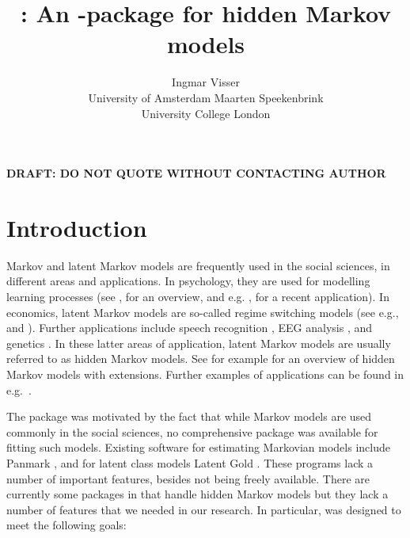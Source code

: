 \documentclass[article]{jss}
\author{Ingmar Visser\\University of Amsterdam \And 
        Maarten Speekenbrink\\University College London}
\title{\pkg{depmixS4} : An \proglang{R}-package for hidden Markov models}
\begin{document}

\maketitle



\begin{center}
\bf{DRAFT: DO NOT QUOTE WITHOUT CONTACTING AUTHOR}
\end{center}

\section{Introduction}

Markov and latent Markov models are frequently used in the social
sciences, in different areas and applications.  In psychology, they
are used for modelling learning processes (see \citealp{Wickens1982},
for an overview, and e.g. \citealp{Schmittmann2006}, for a recent
application).  In economics, latent Markov models are so-called regime
switching models (see e.g., \citealp{Kim1994} and
\citealp{Ghysels1994}).  Further applications include speech
recognition \citep{Rabiner1989}, EEG analysis \citep{Rainer2000}, and
genetics \citep{Krogh1998}.  In these latter areas of application,
latent Markov models are usually referred to as hidden Markov models.
See for example \citet{Fruhwirth2006} for an overview of hidden Markov
models with extensions.  Further examples of applications can be found
in e.g.\ \citet[][chapter~1]{Cappe2005}.

The  package was motivated by the fact that while Markov
models are used commonly in the social sciences, no comprehensive
package was available for fitting such models.  Existing software for
estimating Markovian models include Panmark \citep{Pol1996}, and for
latent class models Latent Gold \citep{Vermunt2003}.  These programs
lack a number of important features, besides not being freely
available.  There are currently some packages in  that
handle hidden Markov models but they lack a number of features that we
needed in our research.  In particular,  was designed to
meet the following goals:
\end{document}
